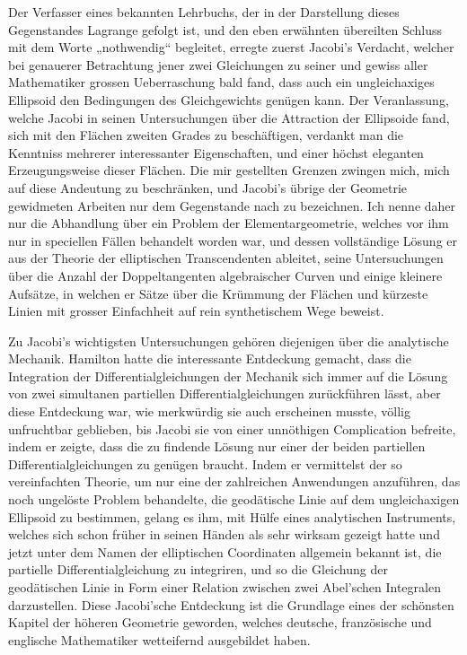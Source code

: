\documentclass[11pt]{article}
\begin{document}
Der Verfasser eines bekannten Lehrbuchs, der in der Darstellung dieses Gegenstandes Lagrange gefolgt ist, und den eben erwähnten übereilten Schluss mit dem Worte „nothwendig“ begleitet, erregte zuerst Jacobi’s Verdacht, welcher bei genauerer Betrachtung jener zwei Gleichungen zu seiner und gewiss aller Mathematiker grossen Ueberraschung bald fand, dass auch ein ungleichaxiges Ellipsoid den Bedingungen des Gleichgewichts genügen kann. Der Veranlassung, welche Jacobi in seinen Untersuchungen über die Attraction der Ellipsoide fand, sich mit den Flächen zweiten Grades zu beschäftigen, verdankt man die Kenntniss mehrerer interessanter Eigenschaften, und einer höchst eleganten Erzeugungsweise dieser Flächen. Die mir gestellten Grenzen zwingen mich, mich auf diese Andeutung zu beschränken, und Jacobi’s übrige der Geometrie gewidmeten Arbeiten nur dem Gegenstande nach zu bezeichnen. Ich nenne daher nur die Abhandlung über ein Problem der Elementargeometrie, welches vor ihm nur in speciellen Fällen behandelt worden war, und dessen vollständige Lösung er aus der Theorie der elliptischen Transcendenten ableitet, seine Untersuchungen über die Anzahl der Doppeltangenten algebraischer Curven und einige kleinere Aufsätze, in welchen er Sätze über die Krümmung der Flächen und kürzeste Linien mit grosser Einfachheit auf rein synthetischem Wege beweist.

Zu Jacobi’s wichtigsten Untersuchungen gehören diejenigen über die analytische Mechanik. Hamilton hatte die interessante Entdeckung gemacht, dass die Integration der Differentialgleichungen der Mechanik sich immer auf die Lösung von zwei simultanen partiellen Differentialgleichungen zurückführen lässt, aber diese Entdeckung war, wie merkwürdig sie auch erscheinen musste, völlig unfruchtbar geblieben, bis Jacobi sie von einer unnöthigen Complication befreite, indem er zeigte, dass die zu findende Lösung nur einer der beiden partiellen Differentialgleichungen zu genügen braucht. Indem er vermittelst der so vereinfachten Theorie, um nur eine der zahlreichen Anwendungen anzuführen, das noch ungelöste Problem behandelte, die geodätische Linie auf dem ungleichaxigen Ellipsoid zu bestimmen, gelang es ihm, mit Hülfe eines analytischen Instruments, welches sich schon früher in seinen Händen als sehr wirksam gezeigt hatte und jetzt unter dem Namen der elliptischen Coordinaten allgemein bekannt ist, die partielle Differentialgleichung zu integriren, und so die Gleichung der geodätischen Linie in Form einer Relation zwischen zwei Abel’schen Integralen darzustellen. Diese Jacobi’sche Entdeckung ist die Grundlage eines der schönsten Kapitel der höheren Geometrie geworden, welches deutsche, französische und englische Mathematiker wetteifernd ausgebildet haben.
\end{document}
